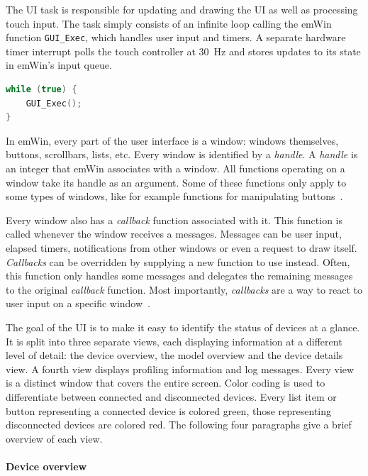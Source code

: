 The UI task is responsible for updating and drawing the UI as well as processing touch input. The
task simply consists of an infinite loop calling the emWin function \mbox{\lstinline{GUI_Exec},}
which handles user input and timers. A separate hardware timer interrupt polls the touch controller
at \SI{30}{\hertz} and stores updates to its state in emWin's input queue.

\begin{lstlisting}[language=C++, caption={Main loop of the UI task}]
while (true) {
    GUI_Exec();
}
\end{lstlisting}

In emWin, every part of the user interface is a window: windows themselves, buttons, scrollbars,
lists, etc. Every window is identified by a \textit{handle}. A \textit{handle} is an integer that
emWin associates with a window. All functions operating on a window take its handle as an argument.
Some of these functions only apply to some types of windows, like for example functions for
manipulating buttons~\cite{emwin-manual}.

Every window also has a \textit{callback} function associated with it. This function is called whenever
the window receives a messages. Messages can be user input, elapsed timers, notifications from other
windows or even a request to draw itself. \textit{Callbacks} can be overridden by supplying a new
function to use instead. Often, this function only handles some messages and delegates the remaining
messages to the original \textit{callback} function. Most importantly, \textit{callbacks} are a way
to react to user input on a specific window~\cite{emwin-manual}.

The goal of the UI is to make it easy to identify the status of devices at a glance. It is split
into three separate views, each displaying information at a different level of detail: the device
overview, the model overview and the device details view. A fourth view displays profiling information
and log messages. Every view is a distinct window that covers the entire screen. Color coding is used
to differentiate between connected and disconnected devices. Every list item or button representing
a connected device is colored green, those representing disconnected devices are colored red. The
following four paragraphs give a brief overview of each view.

\clearpage
\paragraph{Device overview}

